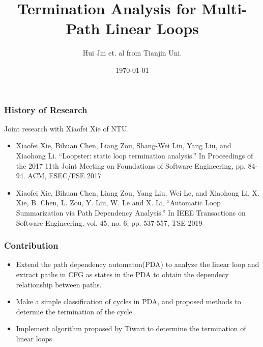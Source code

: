 \documentclass[11pt]{beamer}
\title{Termination Analysis for Multi-Path Linear Loops}
\date{\today}
\author{Hui Jin et. al from Tianjin Uni.}
\begin{document}
\maketitle

\begin{frame}\frametitle{History of Research}
Joint research with Xiaofei Xie of NTU.

\begin{itemize}

\item Xiaofei Xie, Bihuan Chen, Liang Zou, Shang-Wei Lin, Yang Liu, and Xiaohong Li. “Loopster: static loop termination analysis.” In Proceedings of the 2017 11th Joint Meeting on Foundations of Software Engineering, pp. 84-94. ACM, ESEC/FSE 2017
\item Xiaofei Xie, Bihuan Chen, Liang Zou, Yang Liu, Wei Le, and Xiaohong Li. X. Xie, B. Chen, L. Zou, Y. Liu, W. Le and X. Li, “Automatic Loop Summarization via Path Dependency Analysis.” In IEEE Transactions on Software Engineering, vol. 45, no. 6, pp. 537-557, TSE 2019
\end{itemize}
\end{frame}
\begin{frame}\frametitle{Contribution}
\begin{itemize}
\item Extend the path dependency automaton(PDA) to analyze the linear loop and extract paths in CFG as states in the PDA to obtain the dependecy relationship between paths.

\item Make a simple classification of cycles in PDA, and proposed methods to determie the termination of the cycle.

\item Implement algorithm proposed by Tiwari to determine the termination of linear loops. 
\end{itemize}
\end{frame}
\end{document}
